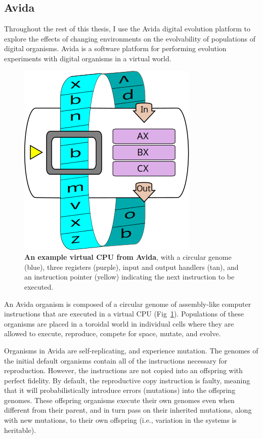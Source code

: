 \documentclass[PhD]{msu-thesis}
\begin{document}
\subsection{Avida}

Throughout the rest of this thesis, I use the Avida digital evolution platform to explore the effects of changing environments on the evolvability of populations of digital organisms.  %
Avida is a software platform for performing evolution experiments with digital organisms in a virtual world.

\begin{figure}[!h]
\includegraphics[width=0.5\columnwidth]{figures/methods/squishedCPU_extra.png}
\caption{\textbf{An example virtual CPU from Avida}, with a circular genome (blue), three registers (purple), input and output handlers (tan), and an instruction pointer (yellow) indicating the next instruction to be executed.%
}\label{fig:cpu}
\end{figure}

An Avida organism is composed of a circular genome of assembly-like computer instructions that are executed in a virtual CPU (Fig~\ref{fig:cpu}). Populations of these organisms are placed in a toroidal world in individual cells where they are allowed to execute, reproduce, compete for space, mutate, and evolve.

Organisms in Avida are self-replicating, and experience mutation. The genomes of the initial default organisms contain all of the instructions necessary for reproduction. However, the instructions are not copied into an offspring with perfect fidelity. By default, the reproductive copy instruction is faulty, meaning that it will probabilistically introduce errors (mutations) into the offspring genomes. These offspring organisms execute their own genomes even when different from their parent, and in turn pass on their inherited mutations, along with new mutations, to their own offspring (i.e., variation in the systems is heritable).
\end{document}
